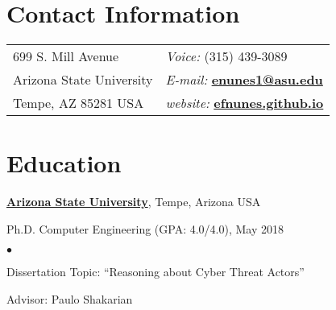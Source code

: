 \documentclass[margin,line]{CV}
\newenvironment{list1}{
  \begin{list}{\ding{113}}{%
      \setlength{\itemsep}{0in}
      \setlength{\parsep}{0in} \setlength{\parskip}{0in}
      \setlength{\topsep}{0in} \setlength{\partopsep}{0in} 
      \setlength{\leftmargin}{0.17in}}}{\end{list}}
\newenvironment{list2}{
  \begin{list}{$\bullet$}{%
      \setlength{\itemsep}{0in}
      \setlength{\parsep}{0in} \setlength{\parskip}{0in}
      \setlength{\topsep}{0in} \setlength{\partopsep}{0in} 
      \setlength{\leftmargin}{0.2in}}}{\end{list}}
\begin{document}

\begin{resume}
\section{\sc Contact Information}
\vspace{.05in}
\begin{tabular}{@{}p{2in}p{4in}}
699 S. Mill Avenue            & {\it Voice:}  (315) 439-3089\\                    
Arizona State University & {\it E-mail:}  \href{mailto:enunes1@asu.edu}{\bf enunes1@asu.edu}\\       
Tempe, AZ  85281 USA  & {\it website:} \href{https://efnunes.github.io/}{\bf efnunes.github.io} \\     
\end{tabular}



\section{\sc Education}
\href{http://www.asu.edu/}{\bf Arizona State University}, Tempe, Arizona USA\\
\vspace*{-.1in}
\begin{list1}
\item[] Ph.D. Computer Engineering (GPA: 4.0/4.0), May 2018
\begin{list2}
\vspace*{.05in}
\item Dissertation Topic:  ``Reasoning about Cyber Threat Actors'' 
\item Advisor:  Paulo Shakarian
\end{list2}
\end{list1}


\end{resume}
\end{document}
